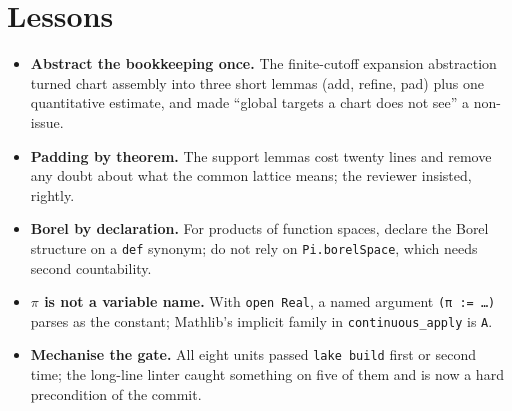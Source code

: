 \documentclass[11pt]{article}
\begin{document}
\section{Lessons}
\begin{itemize}
\item \textbf{Abstract the bookkeeping once.} The finite-cutoff expansion abstraction turned chart
assembly into three short lemmas (add, refine, pad) plus one quantitative estimate, and made
``global targets a chart does not see'' a non-issue.
\item \textbf{Padding by theorem.} The support lemmas cost twenty lines and remove any doubt about what
the common lattice means; the reviewer insisted, rightly.
\item \textbf{Borel by declaration.} For products of function spaces, declare the Borel structure on a
\texttt{def} synonym; do not rely on \texttt{Pi.borelSpace}, which needs second countability.
\item \textbf{$\pi$ is not a variable name.} With \texttt{open Real}, a named argument \texttt{(π := …)}
parses as the constant; Mathlib's implicit family in \texttt{continuous\_apply} is \texttt{A}.
\item \textbf{Mechanise the gate.} All eight units passed \texttt{lake build} first or second time;
the long-line linter caught something on five of them and is now a hard precondition of the commit.
\end{itemize}
\end{document}
